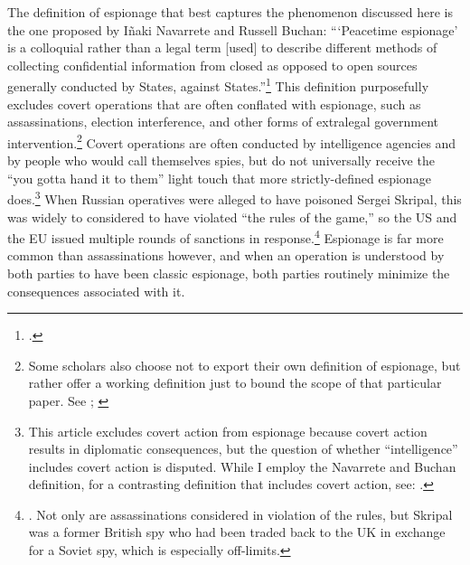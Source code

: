 \documentclass[12pt]{extarticle}
\begin{document}
The definition of espionage that best captures the phenomenon discussed here is the one proposed by I\~{n}aki Navarrete and Russell Buchan: \enquote{\enquote{Peacetime espionage} is a colloquial rather than a legal term [used] to describe different methods of collecting confidential information from closed as opposed to open sources \textelp{} generally conducted by States, against States.}\footcite[901-902]{navarrete_out_2019} This definition purposefully excludes covert operations that are often conflated with espionage, such as assassinations, election interference, and other forms of extralegal government intervention.\footnote{Some scholars also choose not to export their own definition of espionage, but rather offer a working definition just to bound the scope of that particular paper. See \cite[600]{radsan_unresolved_2007}; \cite[2]{kapp_spying_2007}} Covert operations are often conducted by intelligence agencies and by people who would call themselves spies, but do not universally receive the \enquote{you gotta hand it to them} light touch that more strictly-defined espionage does.\footnote{This article excludes covert action from espionage because covert action results in diplomatic consequences, but the question of whether \enquote{intelligence} includes covert action is disputed. While I employ the Navarrete and Buchan definition, for a contrasting definition that includes covert action, see: \cite[518]{stout_intelligence_2018}.} When Russian operatives were alleged to have poisoned Sergei Skripal, this was widely to considered to have violated \enquote{the rules of the game,} so the US and the EU issued multiple rounds of sanctions in response.\footnote{\cite{masters_has_2018}. Not only are assassinations considered in violation of the rules, but Skripal was a former British spy who had been traded back to the UK in exchange for a Soviet spy, which is especially off-limits.} Espionage is far more common than assassinations however, and when an operation is understood by both parties to have been classic espionage, both parties routinely minimize the consequences associated with it.

\end{document}
